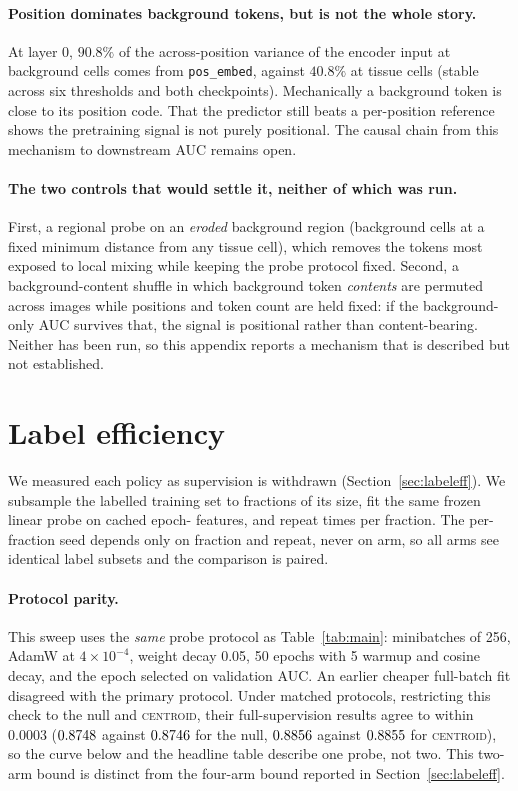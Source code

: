 \documentclass{article}
\newcommand{\ArmBest}{\textsc{centroid}}
\begin{document}
\paragraph{Position dominates background tokens, but is not the whole story.} At
layer 0, $90.8\%$ of the across-position variance of the encoder input at
background cells comes from \texttt{pos\_embed}, against $40.8\%$ at tissue cells
(stable across six thresholds and both checkpoints). Mechanically a background
token is close to its position code. That the predictor still beats a
per-position reference shows the pretraining signal is not purely positional.
The causal chain from this mechanism to downstream AUC remains open.

\paragraph{The two controls that would settle it, neither of which was run.}
First, a regional probe on an \emph{eroded} background region (background
cells at a fixed minimum distance from any tissue cell), which removes the
tokens most exposed to local mixing while keeping the probe protocol fixed.
Second, a background-content shuffle in which background token \emph{contents}
are permuted across images while positions and token count are held fixed: if
the background-only AUC survives that, the signal is positional rather than
content-bearing. Neither has been run, so this appendix
reports a mechanism that is described but not established.

\section{Label efficiency}
\label{app:labeleff}

We measured each policy as supervision is withdrawn
(Section~\ref{sec:labeleff}). We
subsample the labelled training set to fractions of its size, fit the same frozen
linear probe on cached epoch-\LEEpoch{} features, and repeat \LERepeats{} times
per fraction. The per-fraction seed depends only on fraction and repeat, never on
arm, so all arms see identical label subsets and the comparison is paired.

\paragraph{Protocol parity.} This sweep uses the \emph{same} probe protocol as
Table~\ref{tab:main}: minibatches of 256, AdamW at $4{\times}10^{-4}$, weight
decay 0.05, 50 epochs with 5 warmup and cosine decay, and the epoch selected on
validation AUC. An earlier cheaper full-batch fit disagreed with the primary
protocol. Under matched protocols, restricting this check to the null and
\ArmBest{}, their full-supervision results agree to within $0.0003$
($0.8748$ against $0.8746$ for the null,
$0.8856$ against $0.8855$ for \ArmBest{}), so the curve
below and the headline table describe one probe, not two. This two-arm bound is
distinct from the four-arm bound reported in Section~\ref{sec:labeleff}.
\end{document}
